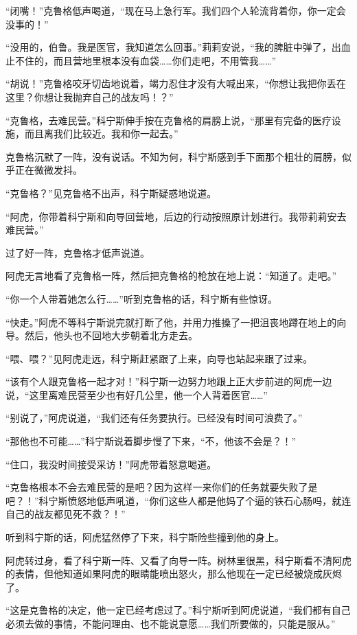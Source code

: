 “闭嘴！”克鲁格低声喝道，“现在马上急行军。我们四个人轮流背着你，你一定会没事的！”

“没用的，伯鲁。我是医官，我知道怎么回事。”莉莉安说，“我的脾脏中弹了，出血止不住的，而且营地里根本没有血袋……你们走吧，不用管我……”

“胡说！”克鲁格咬牙切齿地说着，竭力忍住才没有大喊出来，“你想让我把你丢在这里？你想让我抛弃自己的战友吗！？”

“克鲁格，去难民营。”科宁斯伸手按在克鲁格的肩膀上说，“那里有完备的医疗设施，而且离我们比较近。我和你一起去。”

克鲁格沉默了一阵，没有说话。不知为何，科宁斯感到手下面那个粗壮的肩膀，似乎正在微微发抖。

“克鲁格？”见克鲁格不出声，科宁斯疑惑地说道。

“阿虎，你带着科宁斯和向导回营地，后边的行动按照原计划进行。我带莉莉安去难民营。”

过了好一阵，克鲁格才低声说道。

阿虎无言地看了克鲁格一阵，然后把克鲁格的枪放在地上说：“知道了。走吧。”

“你一个人带着她怎么行……”听到克鲁格的话，科宁斯有些惊讶。

“快走。”阿虎不等科宁斯说完就打断了他，并用力推搡了一把沮丧地蹲在地上的向导。然后，他头也不回地大步朝着北方走去。

“喂、喂？”见阿虎走远，科宁斯赶紧跟了上来，向导也站起来跟了过来。

“该有个人跟克鲁格一起才对！”科宁斯一边努力地跟上正大步前进的阿虎一边说，“这里离难民营至少也有好几公里，他一个人背着医官……”

“别说了，”阿虎说道，“我们还有任务要执行。已经没有时间可浪费了。”

“那他也不可能……”科宁斯说着脚步慢了下来，“不，他该不会是？！”

“住口，我没时间接受采访！”阿虎带着怒意喝道。

“克鲁格根本不会去难民营的是吧？因为这样一来你们的任务就要失败了是吧？！”科宁斯愤怒地低声吼道，“你们这些人都是他妈了个逼的铁石心肠吗，就连自己的战友都见死不救？！”

听到科宁斯的话，阿虎猛然停了下来，科宁斯险些撞到他的身上。

阿虎转过身，看了科宁斯一阵、又看了向导一阵。树林里很黑，科宁斯看不清阿虎的表情，但他知道如果阿虎的眼睛能喷出怒火，那么他现在一定已经被烧成灰烬了。

“这是克鲁格的决定，他一定已经考虑过了。”科宁斯听到阿虎说道，“我们都有自己必须去做的事情，不能问理由、也不能说意愿……我们所要做的，只能是服从。”

